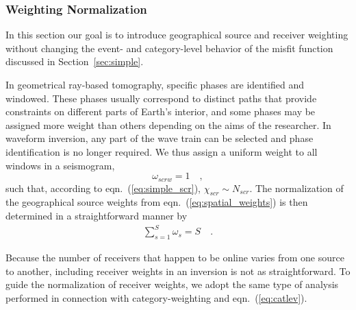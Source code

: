 \subsubsection{Weighting Normalization}
\label{sec:norm}

In this section our goal is to introduce geographical source and receiver weighting without changing the event- and category-level behavior of the misfit function discussed in Section~\ref{sec:simple}.  

In geometrical ray-based tomography, specific phases are identified and windowed. These phases usually correspond to distinct paths that provide constraints 
on different parts of Earth's interior, and some phases may be assigned more weight than others 
depending on the aims of the researcher.
In waveform inversion, any part of the wave train can 
be selected and phase identification is no longer required. We thus assign a uniform weight to all windows in a seismogram,
\begin{equation}
\label{eq:I_omega_scrw}
\omega_{scrw} = 1
\quad ,
\end{equation}
such that, according to eqn.~(\ref{eq:simple_scr}), $\chi_{scr}\sim N_{scr}$.
The normalization of the geographical source weights from eqn.~(\ref{eq:spatial_weights}) 
is then determined in a straightforward manner by
\begin{align}
\label{eqn:src_norm}
\sum_{s=1}^{S} \omega_{s} = S
\quad .
\end{align}

Because the number of receivers that happen to be online varies from one source to another, including receiver weights in an inversion is not as straightforward.
To guide the normalization of receiver weights, we adopt the same type of analysis performed in connection with category-weighting and eqn.~(\ref{eq:catlev}).

